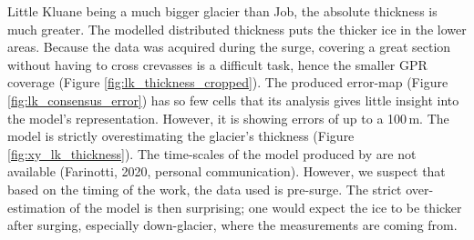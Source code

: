 \documentclass[a4, 12pt]{article}
\newcommand{\fref}[1]{(Figure \ref{#1})}
\begin{document}
Little Kluane being a much bigger glacier than Job, the absolute thickness is much greater. The modelled distributed thickness puts the thicker ice in the lower areas. Because the data was acquired during the surge, covering a great section without having to cross crevasses is a difficult task, hence the smaller GPR coverage \fref{fig:lk_thickness_cropped}. The produced error-map \fref{fig:lk_consensus_error} has so few cells that its analysis gives little insight into the model's representation. However, it is showing errors of up to a 100\,m. The model is strictly overestimating the glacier's thickness \fref{fig:xy_lk_thickness}. The time-scales of the model produced by \citet{farinotti2019consensus} are not available (Farinotti, 2020, personal communication). However, we suspect that based on the timing of the work, the data used is pre-surge. The strict over-estimation of the model is then surprising; one would expect the ice to be thicker after surging, especially down-glacier, where the measurements are coming from.

\FloatBarrier
\pagebreak
\end{document}
